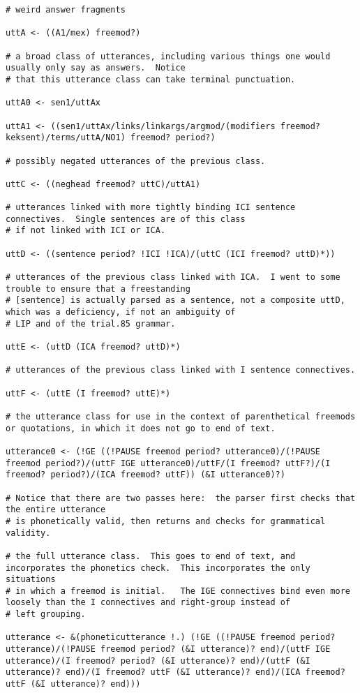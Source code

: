 \documentclass{article}
\begin{document}
\begin{verbatim}
# weird answer fragments

uttA <- ((A1/mex) freemod?)

# a broad class of utterances, including various things one would usually only say as answers.  Notice
# that this utterance class can take terminal punctuation.

uttA0 <- sen1/uttAx

uttA1 <- ((sen1/uttAx/links/linkargs/argmod/(modifiers freemod? keksent)/terms/uttA/NO1) freemod? period?)

# possibly negated utterances of the previous class.

uttC <- ((neghead freemod? uttC)/uttA1)

# utterances linked with more tightly binding ICI sentence connectives.  Single sentences are of this class
# if not linked with ICI or ICA.

uttD <- ((sentence period? !ICI !ICA)/(uttC (ICI freemod? uttD)*))

# utterances of the previous class linked with ICA.  I went to some trouble to ensure that a freestanding
# [sentence] is actually parsed as a sentence, not a composite uttD, which was a deficiency, if not an ambiguity of
# LIP and of the trial.85 grammar.

uttE <- (uttD (ICA freemod? uttD)*)

# utterances of the previous class linked with I sentence connectives.

uttF <- (uttE (I freemod? uttE)*)

# the utterance class for use in the context of parenthetical freemods or quotations, in which it does not go to end of text.

utterance0 <- (!GE ((!PAUSE freemod period? utterance0)/(!PAUSE freemod period?)/(uttF IGE utterance0)/uttF/(I freemod? uttF?)/(I freemod? period?)/(ICA freemod? uttF)) (&I utterance0)?)

# Notice that there are two passes here:  the parser first checks that the entire utterance
# is phonetically valid, then returns and checks for grammatical validity.

# the full utterance class.  This goes to end of text, and incorporates the phonetics check.  This incorporates the only situations
# in which a freemod is initial.   The IGE connectives bind even more loosely than the I connectives and right-group instead of 
# left grouping.

utterance <- &(phoneticutterance !.) (!GE ((!PAUSE freemod period? utterance)/(!PAUSE freemod period? (&I utterance)? end)/(uttF IGE utterance)/(I freemod? period? (&I utterance)? end)/(uttF (&I utterance)? end)/(I freemod? uttF (&I utterance)? end)/(ICA freemod? uttF (&I utterance)? end)))




\end{verbatim}
\end{document}
